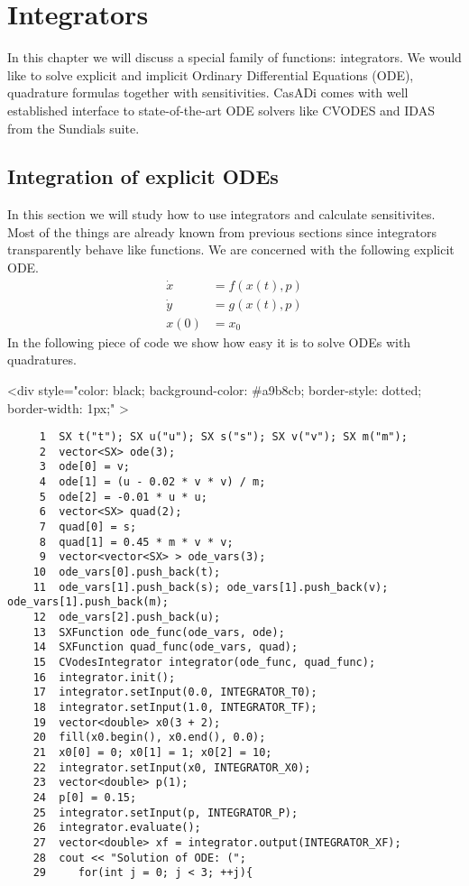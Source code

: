 \documentclass[a4paper,12pt]{book}
\newcommand{\codebegin}{
\begin{rawhtml}
<div style="color: black; background-color: \#a9b8cb;  border-style: dotted; border-width: 1px;" >
\end{rawhtml}
}
\begin{document}
{\chapter{Integrators \label{chapter:integrators}}
In this chapter we will discuss a special family of functions: integrators. We would like to solve explicit and implicit 
Ordinary Differential Equations (ODE), quadrature formulas together with sensitivities. CasADi comes with well established
interface to state-of-the-art ODE solvers like CVODES and IDAS from the Sundials suite.
\section{Integration of explicit ODEs}
In this section we will study how to use integrators and calculate sensitivites. Most of the things are already known from previous sections
since integrators transparently behave like functions. We are concerned with the following explicit ODE.
\begin{align}
\dot{x} &= f(x(t), p)\\
\dot{y} &= g(x(t), p)\\
x(0) &= x_0
\end{align}
In the following piece of code we show how easy it is to solve ODEs with quadratures.
\par
\codebegin
\begin{verbatim}
     1  SX t("t"); SX u("u"); SX s("s"); SX v("v"); SX m("m");
     2  vector<SX> ode(3);
     3  ode[0] = v;
     4  ode[1] = (u - 0.02 * v * v) / m;
     5  ode[2] = -0.01 * u * u;
     6  vector<SX> quad(2);
     7  quad[0] = s;
     8  quad[1] = 0.45 * m * v * v;
     9  vector<vector<SX> > ode_vars(3);
    10  ode_vars[0].push_back(t);
    11  ode_vars[1].push_back(s); ode_vars[1].push_back(v); ode_vars[1].push_back(m);
    12  ode_vars[2].push_back(u);
    13  SXFunction ode_func(ode_vars, ode);
    14  SXFunction quad_func(ode_vars, quad);
    15  CVodesIntegrator integrator(ode_func, quad_func);
    16  integrator.init();
    17  integrator.setInput(0.0, INTEGRATOR_T0);
    18  integrator.setInput(1.0, INTEGRATOR_TF);
    19  vector<double> x0(3 + 2);
    20  fill(x0.begin(), x0.end(), 0.0);
    21  x0[0] = 0; x0[1] = 1; x0[2] = 10;
    22  integrator.setInput(x0, INTEGRATOR_X0);
    23  vector<double> p(1);
    24  p[0] = 0.15;
    25  integrator.setInput(p, INTEGRATOR_P);
    26  integrator.evaluate();
    27  vector<double> xf = integrator.output(INTEGRATOR_XF);
    28  cout << "Solution of ODE: (";
    29     for(int j = 0; j < 3; ++j){

\end{verbatim}}
\end{document}
